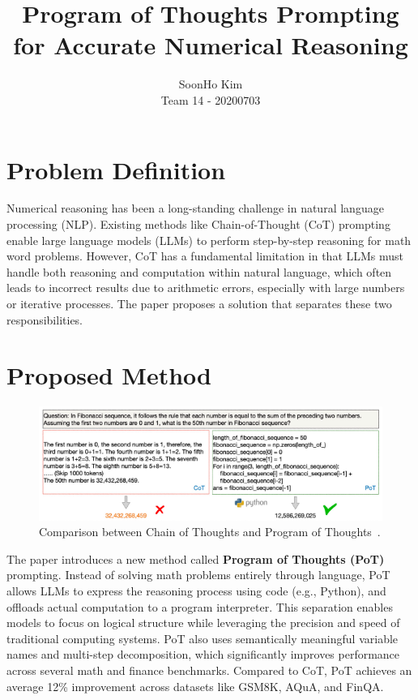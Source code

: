 \documentclass{article}
\title{Program of Thoughts Prompting for Accurate Numerical Reasoning}
\author{%
SoonHo Kim \\
Team 14 - 20200703 \\
}
\begin{document}
\maketitle


\section{Problem Definition}

Numerical reasoning has been a long-standing challenge in natural language processing (NLP). Existing methods like Chain-of-Thought (CoT) prompting enable large language models (LLMs) to perform step-by-step reasoning for math word problems. However, CoT has a fundamental limitation in that LLMs must handle both reasoning and computation within natural language, which often leads to incorrect results due to arithmetic errors, especially with large numbers or iterative processes. The paper proposes a solution that separates these two responsibilities.

\section{Proposed Method}

\begin{figure}[h]
  \centering
  \includegraphics[width=0.8\linewidth]{figure1.png}
  \caption{Comparison between Chain of Thoughts and Program of Thoughts~\cite{chen2022program}.}
  \label{fig:cot-vs-pot}
\end{figure}

The paper introduces a new method called \textbf{Program of Thoughts (PoT)} prompting. Instead of solving math problems entirely through language, PoT allows LLMs to express the reasoning process using code (e.g., Python), and offloads actual computation to a program interpreter. This separation enables models to focus on logical structure while leveraging the precision and speed of traditional computing systems. PoT also uses semantically meaningful variable names and multi-step decomposition, which significantly improves performance across several math and finance benchmarks. Compared to CoT, PoT achieves an average 12\% improvement across datasets like GSM8K, AQuA, and FinQA.
\end{document}
